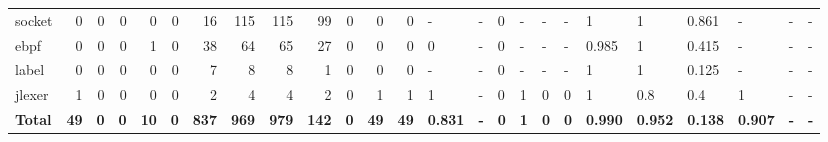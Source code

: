 \begin{table}[htp!]
\begin{adjustbox}{max width=\textwidth}
\begin{tabular}{l||rrr|rrr|rrr|rrr||lll|lll|lll|lll}
            socket           & 0                     & 0          & 0          & 0                      & 0          & 16           & 115                   & 115          & 99           & 0                      & 0           & 0           & -              & -          & 0          & -             & -          & -          & 1              & 1              & 0.861          & -              & -          & -          \\
            \rowcolor{verylightgray}
            ebpf             & 0                     & 0          & 0          & 1                      & 0          & 38           & 64                    & 65           & 27           & 0                      & 0           & 0           & 0              & -          & 0          & -             & -          & -          & 0.985          & 1              & 0.415          & -              & -          & -          \\
            label            & 0                     & 0          & 0          & 0                      & 0          & 7            & 8                     & 8            & 1            & 0                      & 0           & 0           & -              & -          & 0          & -             & -          & -          & 1              & 1              & 0.125          & -              & -          & -          \\
            \rowcolor{verylightgray}
            jlexer           & 1                     & 0          & 0          & 0                      & 0          & 2            & 4                     & 4            & 2            & 0                      & 1           & 1           & 1              & -          & 0          & 1             & 0          & 0          & 1              & 0.8            & 0.4            & 1              & -          & -          \\
            \hline
            \textbf{Total}   & \textbf{49}           & \textbf{0} & \textbf{0} & \textbf{10}            & \textbf{0} & \textbf{837} & \textbf{969}          & \textbf{979} & \textbf{142} & \textbf{0}             & \textbf{49} & \textbf{49} & \textbf{0.831} & \textbf{-} & \textbf{0} & \textbf{1}    & \textbf{0} & \textbf{0} & \textbf{0.990} & \textbf{0.952} & \textbf{0.138} & \textbf{0.907} & \textbf{-} & \textbf{-} \\
        \end{tabular}
    \end{adjustbox}
\end{table}